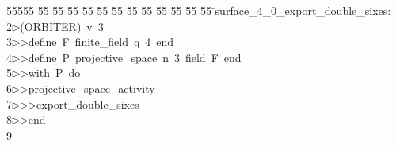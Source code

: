 %
%
\begin{tabbing}
55555 \= 55 \= 55 \= 55 \= 55 \= 55 \= 55 \= 55 \= 55 \= 55 \= 55 \= 55 \= 55 \= \>surface\_4\_0\_export\_double\_sixes:\\[0pt]
2\>$\triangleright$\>(ORBITER)\ v\ 3\ \\[0pt]
3\>$\triangleright$\>$\triangleright$\>define\ F\ finite\_field\ q\ 4\ end\ \\[0pt]
4\>$\triangleright$\>$\triangleright$\>define\ P\ projective\_space\ n\ 3\ field\ F\ end\ \\[0pt]
5\>$\triangleright$\>$\triangleright$\>with\ P\ do\ \\[0pt]
6\>$\triangleright$\>$\triangleright$\>projective\_space\_activity\ \\[0pt]
7\>$\triangleright$\>$\triangleright$\>$\triangleright$\>export\_double\_sixes\ \\[0pt]
8\>$\triangleright$\>$\triangleright$\>end\ \\[0pt]
9\>\end{tabbing}
